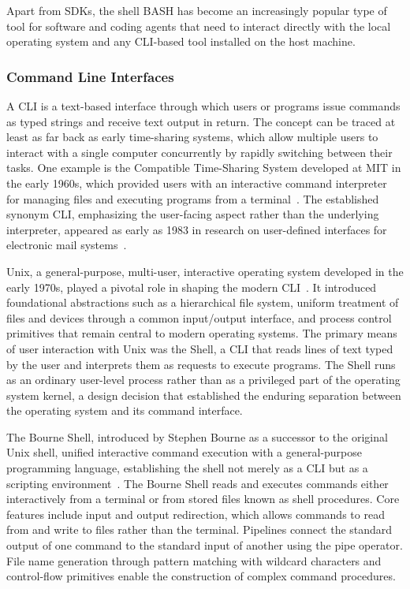 \documentclass[
english,                 %
bibtex,                  %
]{kththesis}
\numberwithin{listing}{chapter}
\begin{document}
Apart from \glspl{SDK}, the shell \gls{BASH} has become an increasingly popular type of tool for software and coding agents that need to interact directly with the local operating system and any \gls{CLI}-based tool installed on the host machine.

\subsubsection{Command Line Interfaces}
\label{sec:bg_command_line_interface}

A \gls{CLI} is a text-based interface through which users or programs issue commands as typed strings and receive text output in return. The concept can be traced at least as far back as early time-sharing systems, which allow multiple users to interact with a single computer concurrently by rapidly switching between their tasks. One example is the Compatible Time-Sharing System developed at \gls{MIT} in the early 1960s, which provided users with an interactive command interpreter for managing files and executing programs from a terminal~\cite{corbato_experimental_1962}. The established synonym \gls{CLI}, emphasizing the user-facing aspect rather than the underlying interpreter, appeared as early as 1983 in research on user-defined interfaces for electronic mail systems~\cite{wixon_building_1983}.

Unix, a general-purpose, multi-user, interactive operating system developed in the early 1970s, played a pivotal role in shaping the modern \gls{CLI}~\cite{ritchie_unix_1974}. It introduced foundational abstractions such as a hierarchical file system, uniform treatment of files and devices through a common input/output interface, and process control primitives that remain central to modern operating systems. The primary means of user interaction with Unix was the Shell, a \gls{CLI} that reads lines of text typed by the user and interprets them as requests to execute programs. The Shell runs as an ordinary user-level process rather than as a privileged part of the operating system kernel, a design decision that established the enduring separation between the operating system and its command interface.

The Bourne Shell, introduced by Stephen Bourne as a successor to the original Unix shell, unified interactive command execution with a general-purpose programming language, establishing the shell not merely as a \gls{CLI} but as a scripting environment~\cite{bourne_introduction_1997}. The Bourne Shell reads and executes commands either interactively from a terminal or from stored files known as shell procedures. Core features include input and output redirection, which allows commands to read from and write to files rather than the terminal. Pipelines connect the standard output of one command to the standard input of another using the pipe operator. File name generation through pattern matching with wildcard characters and control-flow primitives enable the construction of complex command procedures.
\end{document}
